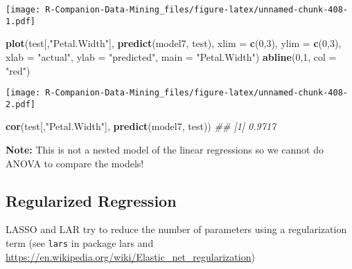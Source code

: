 \documentclass[
  notitlepage]{book}
\newenvironment{Shaded}{\begin{snugshade}}{\end{snugshade}}
\newcommand{\CommentTok}[1]{\textcolor[rgb]{0.56,0.35,0.01}{\textit{#1}}}
\newcommand{\DataTypeTok}[1]{\textcolor[rgb]{0.13,0.29,0.53}{#1}}
\newcommand{\DecValTok}[1]{\textcolor[rgb]{0.00,0.00,0.81}{#1}}
\newcommand{\KeywordTok}[1]{\textcolor[rgb]{0.13,0.29,0.53}{\textbf{#1}}}
\newcommand{\NormalTok}[1]{#1}
\newcommand{\OperatorTok}[1]{\textcolor[rgb]{0.81,0.36,0.00}{\textbf{#1}}}
\newcommand{\StringTok}[1]{\textcolor[rgb]{0.31,0.60,0.02}{#1}}
\begin{document}
\texttt{[image: R-Companion-Data-Mining\_files/figure-latex/unnamed-chunk-408-1.pdf]}

\begin{Shaded}
\end{Shaded}

\begin{Shaded}
\begin{Highlighting}[]
\KeywordTok{plot}\NormalTok{(test[,}\StringTok{"Petal.Width"}\NormalTok{], }\KeywordTok{predict}\NormalTok{(model7, test),}
  \DataTypeTok{xlim =} \KeywordTok{c}\NormalTok{(}\DecValTok{0}\NormalTok{,}\DecValTok{3}\NormalTok{), }\DataTypeTok{ylim =} \KeywordTok{c}\NormalTok{(}\DecValTok{0}\NormalTok{,}\DecValTok{3}\NormalTok{), }
  \DataTypeTok{xlab =} \StringTok{"actual"}\NormalTok{, }\DataTypeTok{ylab =} \StringTok{"predicted"}\NormalTok{,}
  \DataTypeTok{main =} \StringTok{"Petal.Width"}\NormalTok{)}
\KeywordTok{abline}\NormalTok{(}\DecValTok{0}\NormalTok{,}\DecValTok{1}\NormalTok{, }\DataTypeTok{col =} \StringTok{"red"}\NormalTok{)}
\end{Highlighting}
\end{Shaded}

\texttt{[image: R-Companion-Data-Mining\_files/figure-latex/unnamed-chunk-408-2.pdf]}

\begin{Shaded}
\begin{Highlighting}[]
\KeywordTok{cor}\NormalTok{(test[,}\StringTok{"Petal.Width"}\NormalTok{], }\KeywordTok{predict}\NormalTok{(model7, test))}
\CommentTok{\#\# [1] 0.9717}
\end{Highlighting}
\end{Shaded}

\textbf{Note:} This is not a nested model of the linear regressions so we cannot
do ANOVA to compare the models!

\hypertarget{regularized-regression}{%
\subsection{Regularized Regression}\label{regularized-regression}}

LASSO and LAR try to reduce the number of parameters using a
regularization term (see \texttt{lars} in package lars and \url{https://en.wikipedia.org/wiki/Elastic_net_regularization})
\end{document}
